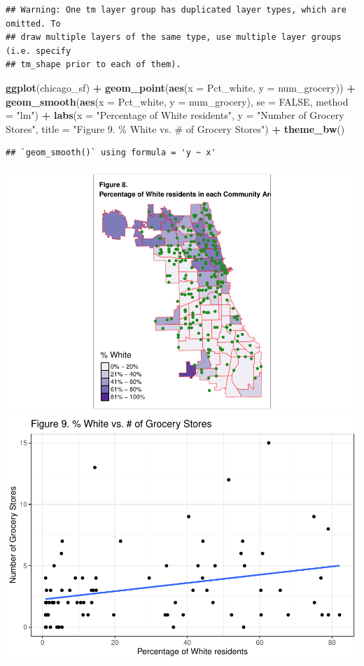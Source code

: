 \documentclass[
]{article}
\newenvironment{Shaded}{\begin{snugshade}}{\end{snugshade}}
\newcommand{\AttributeTok}[1]{\textcolor[rgb]{0.13,0.29,0.53}{#1}}
\newcommand{\ConstantTok}[1]{\textcolor[rgb]{0.56,0.35,0.01}{#1}}
\newcommand{\FunctionTok}[1]{\textcolor[rgb]{0.13,0.29,0.53}{\textbf{#1}}}
\newcommand{\NormalTok}[1]{#1}
\newcommand{\SpecialCharTok}[1]{\textcolor[rgb]{0.81,0.36,0.00}{\textbf{#1}}}
\newcommand{\StringTok}[1]{\textcolor[rgb]{0.31,0.60,0.02}{#1}}
\begin{document}
\begin{verbatim}
## Warning: One tm layer group has duplicated layer types, which are omitted. To
## draw multiple layers of the same type, use multiple layer groups (i.e. specify
## tm_shape prior to each of them).
\end{verbatim}

\begin{Shaded}
\begin{Highlighting}[]
\FunctionTok{ggplot}\NormalTok{(chicago\_sf) }\SpecialCharTok{+}
  \FunctionTok{geom\_point}\NormalTok{(}\FunctionTok{aes}\NormalTok{(}\AttributeTok{x =}\NormalTok{ Pct\_white, }\AttributeTok{y =}\NormalTok{ num\_grocery)) }\SpecialCharTok{+}
  \FunctionTok{geom\_smooth}\NormalTok{(}\FunctionTok{aes}\NormalTok{(}\AttributeTok{x =}\NormalTok{ Pct\_white, }\AttributeTok{y =}\NormalTok{ num\_grocery), }\AttributeTok{se =} \ConstantTok{FALSE}\NormalTok{, }\AttributeTok{method =} \StringTok{"lm"}\NormalTok{) }\SpecialCharTok{+}
  \FunctionTok{labs}\NormalTok{(}\AttributeTok{x =} \StringTok{"Percentage of White residents"}\NormalTok{,}
       \AttributeTok{y =} \StringTok{"Number of Grocery Stores"}\NormalTok{,}
       \AttributeTok{title =} \StringTok{"Figure 9. \% White vs. \# of Grocery Stores"}\NormalTok{) }\SpecialCharTok{+}
  \FunctionTok{theme\_bw}\NormalTok{()}
\end{Highlighting}
\end{Shaded}

\begin{verbatim}
## `geom_smooth()` using formula = 'y ~ x'
\end{verbatim}

\includegraphics[width=0.5\linewidth]{Sam-Song_Coding-Sample_files/figure-latex/unnamed-chunk-10-1}
\includegraphics[width=0.5\linewidth]{Sam-Song_Coding-Sample_files/figure-latex/unnamed-chunk-10-2}
\end{document}
